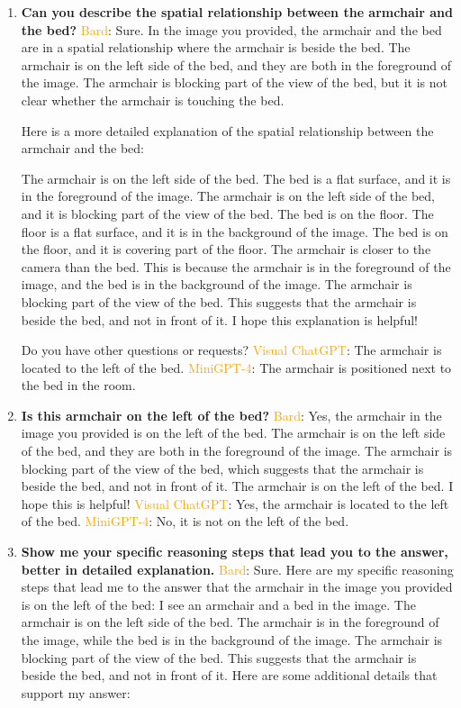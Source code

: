 \begin{enumerate}
    \item \textbf{Can you describe the spatial relationship between the armchair and the bed?}
    \subitem \textcolor{orange}{Bard}: 
    Sure. In the image you provided, the armchair and the bed are in a spatial relationship where the armchair is beside the bed. The armchair is on the left side of the bed, and they are both in the foreground of the image. The armchair is blocking part of the view of the bed, but it is not clear whether the armchair is touching the bed.
    
    Here is a more detailed explanation of the spatial relationship between the armchair and the bed:
    
    The armchair is on the left side of the bed. The bed is a flat surface, and it is in the foreground of the image. The armchair is on the left side of the bed, and it is blocking part of the view of the bed.
    The bed is on the floor. The floor is a flat surface, and it is in the background of the image. The bed is on the floor, and it is covering part of the floor.
    The armchair is closer to the camera than the bed. This is because the armchair is in the foreground of the image, and the bed is in the background of the image.
    The armchair is blocking part of the view of the bed. This suggests that the armchair is beside the bed, and not in front of it.
    I hope this explanation is helpful!
    
    Do you have other questions or requests?
    \subitem \textcolor{orange}{Visual ChatGPT}: The armchair is located to the left of the bed.
    \subitem \textcolor{orange}{MiniGPT-4}: The armchair is positioned next to the bed in the room.
    \item \textbf{Is this armchair on the left of the bed?}
    \subitem \textcolor{orange}{Bard}: 
    Yes, the armchair in the image you provided is on the left of the bed. The armchair is on the left side of the bed, and they are both in the foreground of the image. The armchair is blocking part of the view of the bed, which suggests that the armchair is beside the bed, and not in front of it. The armchair is on the left of the bed.
    I hope this is helpful!
    \subitem \textcolor{orange}{Visual ChatGPT}: Yes, the armchair is located to the left of the bed.
    \subitem \textcolor{orange}{MiniGPT-4}: No, it is not on the left of the bed.
    \item \textbf{Show me your specific reasoning steps that lead you to the answer, better in detailed explanation.}
    \subitem \textcolor{orange}{Bard}: 
    Sure. Here are my specific reasoning steps that lead me to the answer that the armchair in the image you provided is on the left of the bed:
    I see an armchair and a bed in the image.
    The armchair is on the left side of the bed.
    The armchair is in the foreground of the image, while the bed is in the background of the image.
    The armchair is blocking part of the view of the bed. This suggests that the armchair is beside the bed, and not in front of it.
    Here are some additional details that support my answer:


\end{enumerate}
